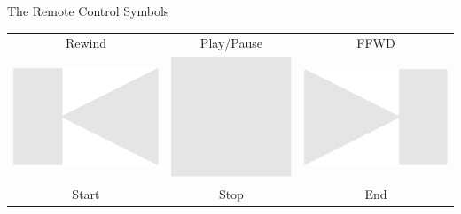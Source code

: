 \documentclass[14pt]{beamer}
\begin{document}
\begin{frame}{The Remote Control Symbols}
\begin{center}
\begin{tabular}{ccc}
                 Rewind \quad&\quad Play/Pause \quad&\quad FFWD \\[2.5ex]
                      \includegraphics[scale=0.2]{figures/figure026o.pdf} \quad&
                 \quad\includegraphics[scale=0.2]{figures/figure026m.pdf} \quad&
                 \quad\includegraphics[scale=0.2]{figures/figure026n.pdf} \\
                 Start \quad&\quad Stop \quad&\quad End \\[1.5ex]

\end{tabular}
\end{center}
\end{frame}
\end{document}
